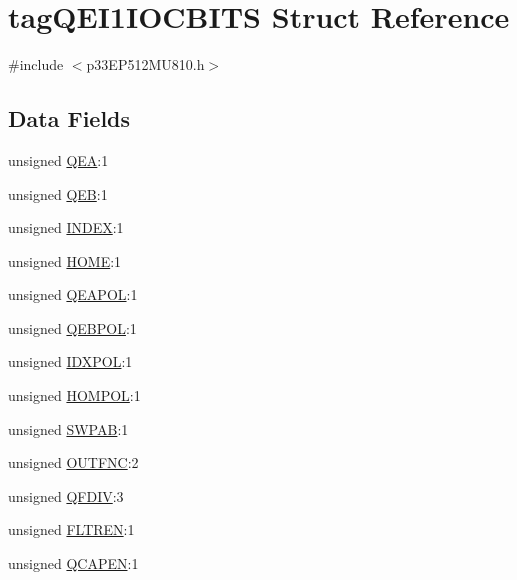 \hypertarget{structtag_q_e_i1_i_o_c_b_i_t_s}{}\section{tag\+Q\+E\+I1\+I\+O\+C\+B\+I\+TS Struct Reference}
\label{structtag_q_e_i1_i_o_c_b_i_t_s}


{\ttfamily \#include $<$p33\+E\+P512\+M\+U810.\+h$>$}

\subsection*{Data Fields}
\begin{DoxyCompactItemize}
\item 
unsigned \hyperlink{structtag_q_e_i1_i_o_c_b_i_t_s_ad66d85d1b3facf757fc4a8d2dac405f4}{Q\+EA}\+:1
\item 
unsigned \hyperlink{structtag_q_e_i1_i_o_c_b_i_t_s_af72baafcec10f2280ff08f927d23bec4}{Q\+EB}\+:1
\item 
unsigned \hyperlink{structtag_q_e_i1_i_o_c_b_i_t_s_a2abd612f12243679e56dc81af03c241c}{I\+N\+D\+EX}\+:1
\item 
unsigned \hyperlink{structtag_q_e_i1_i_o_c_b_i_t_s_a13b64d5bd0cd26432e6ae0606b43dad7}{H\+O\+ME}\+:1
\item 
unsigned \hyperlink{structtag_q_e_i1_i_o_c_b_i_t_s_ac6f8d85f6c36e3bb941101a442c3fa45}{Q\+E\+A\+P\+OL}\+:1
\item 
unsigned \hyperlink{structtag_q_e_i1_i_o_c_b_i_t_s_acc4d6b7648aba40233c55b8e2fbd3b70}{Q\+E\+B\+P\+OL}\+:1
\item 
unsigned \hyperlink{structtag_q_e_i1_i_o_c_b_i_t_s_ac619785281fb989401e5c34e8fc802e1}{I\+D\+X\+P\+OL}\+:1
\item 
unsigned \hyperlink{structtag_q_e_i1_i_o_c_b_i_t_s_add17e149adc5b994bb4811c825cfdb40}{H\+O\+M\+P\+OL}\+:1
\item 
unsigned \hyperlink{structtag_q_e_i1_i_o_c_b_i_t_s_ac733d4f6fbe27b15c7b2968f3b544589}{S\+W\+P\+AB}\+:1
\item 
unsigned \hyperlink{structtag_q_e_i1_i_o_c_b_i_t_s_a4233484122ca33fd96b7a95f438fe574}{O\+U\+T\+F\+NC}\+:2
\item 
unsigned \hyperlink{structtag_q_e_i1_i_o_c_b_i_t_s_a22d6fb9c6c4624daa74340826a9a06cb}{Q\+F\+D\+IV}\+:3
\item 
unsigned \hyperlink{structtag_q_e_i1_i_o_c_b_i_t_s_ac89c6ee71679f74073d2a1f2503bb07e}{F\+L\+T\+R\+EN}\+:1
\item 
unsigned \hyperlink{structtag_q_e_i1_i_o_c_b_i_t_s_a0675b4c9b91f9b14a9c58b41e940b06b}{Q\+C\+A\+P\+EN}\+:1
\end{DoxyCompactItemize}


